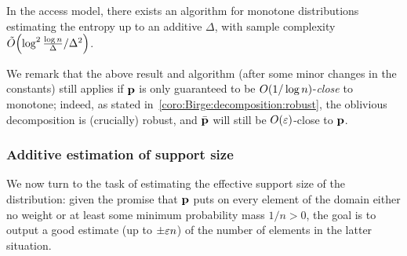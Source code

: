 \begin{theorem}\label{theorem:entropy:estimation:additive:monotone}
In the \cdfsamp access model, there exists an algorithm for monotone distributions estimating the entropy up to an additive $\Delta$, with sample complexity $\tildeO{{\log^2\frac{\log n}{\Delta}}/{\Delta^2}}$.
\end{theorem}

\begin{remark}\label{remark:entropy:estimation:additive:monotone:close}
We remark that the above result and algorithm (after some minor changes in the constants) still applies if $\mathbf{p}$ is only guaranteed to be $\bigO{1/\log n}$-\emph{close} to monotone; indeed, as stated in~\cref{coro:Birge:decomposition:robust}, the oblivious decomposition is (crucially) {robust}, and $\bar{\mathbf{p}}$ will still be $\bigO{\eps}$-close to $\mathbf{p}$.
\end{remark}
 
\subsubsection{Additive estimation of support size}
We now turn to the task of estimating the effective support size of the distribution: given the promise that $\mathbf{p}$ puts on every element of the domain either no weight or at least some minimum probability mass $1/n > 0$, the goal is to output a good estimate (up to $\pm\varepsilon n$) of the number of elements in the latter situation.

